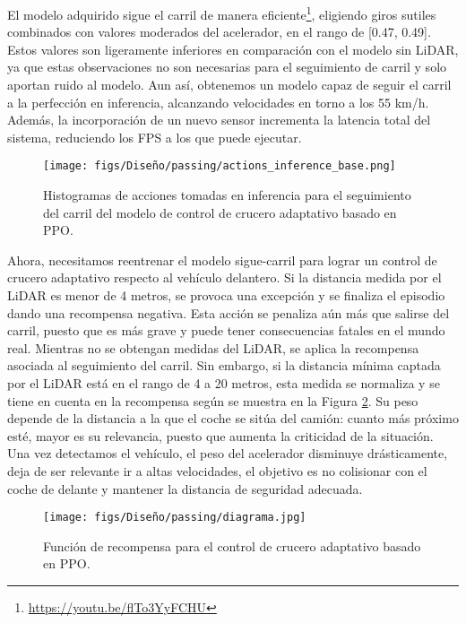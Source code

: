 El modelo adquirido sigue el carril de manera eficiente\footnote{\url{https://youtu.be/flTo3YyFCHU}}, eligiendo giros sutiles combinados con valores moderados del acelerador, en el rango de [0.47, 0.49]. Estos valores son ligeramente inferiores en comparación con el modelo sin \ac{LiDAR}, ya que estas observaciones no son necesarias para el seguimiento de carril y solo aportan ruido al modelo. Aun así, obtenemos un modelo capaz de seguir el carril a la perfección en inferencia, alcanzando velocidades en torno a los 55 km/h. Además, la incorporación de un nuevo sensor incrementa la latencia total del sistema, reduciendo los \ac{FPS} a los que puede ejecutar.
\begin{figure}[ht]
\centering
\texttt{[image: figs/Diseño/passing/actions\_inference\_base.png]}
\caption{Histogramas de acciones tomadas en inferencia para el seguimiento del carril del modelo de control de crucero adaptativo basado en \ac{PPO}.}
\label{fig:passing_inference_lane}
\end{figure}

\newpage

Ahora, necesitamos reentrenar el modelo sigue-carril para lograr un control de crucero adaptativo respecto al vehículo delantero. Si la distancia medida por el \ac{LiDAR} es menor de 4 metros, se provoca una excepción y se finaliza el episodio dando una recompensa negativa. Esta acción se penaliza aún más que salirse del carril, puesto que es más grave y puede tener consecuencias fatales en el mundo real. Mientras no se obtengan medidas del \ac{LiDAR}, se aplica la recompensa asociada al seguimiento del carril. Sin embargo, si la distancia mínima captada por el \ac{LiDAR} está en el rango de 4 a 20 metros, esta medida se normaliza y se tiene en cuenta en la recompensa según se muestra en la Figura \ref{fig:diagrama_lidar}. Su peso depende de la distancia a la que el coche se sitúa del camión: cuanto más próximo esté, mayor es su relevancia, puesto que aumenta la criticidad de la situación. Una vez detectamos el vehículo, el peso del acelerador disminuye drásticamente, deja de ser relevante ir a altas velocidades, el objetivo es no colisionar con el coche de delante y mantener la distancia de seguridad adecuada.

\begin{figure}[ht]
\centering
\texttt{[image: figs/Diseño/passing/diagrama.jpg]}
\caption{Función de recompensa para el control de crucero adaptativo basado en \ac{PPO}.} \label{fig:diagrama_lidar}
\end{figure}

